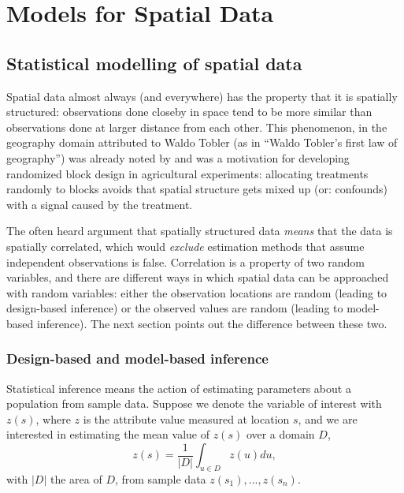 \documentclass[]{book}
\begin{document}
\hypertarget{part-models-for-spatial-data}{%
\part{Models for Spatial Data}\label{part-models-for-spatial-data}}

\hypertarget{statistical-modelling-of-spatial-data}{%
\chapter{Statistical modelling of spatial data}\label{statistical-modelling-of-spatial-data}}

Spatial data almost always (and everywhere) has the property that it
is spatially structured: observations done closeby in space tend to
be more similar than observations done at larger distance from each
other. This phenomenon, in the geography domain attributed to Waldo
Tobler (as in ``Waldo Tobler's first law of geography'') was already
noted by \citep{fisher1937design} and was a motivation for developing
randomized block design in agricultural experiments: allocating
treatments randomly to blocks avoids that spatial structure gets
mixed up (or: confounds) with a signal caused by the treatment.

The often heard argument that spatially structured data \emph{means}
that the data is spatially correlated, which would \emph{exclude}
estimation methods that assume independent observations is false.
Correlation is a property of two random variables, and there are
different ways in which spatial data can be approached with random
variables: either the observation locations are random (leading to
design-based inference) or the observed values are random (leading
to model-based inference). The next section points out the difference
between these two.

\hypertarget{design}{%
\section{Design-based and model-based inference}\label{design}}

Statistical inference means the action of estimating parameters
about a population from sample data. Suppose we denote the variable
of interest with \(z(s)\), where \(z\) is the attribute value measured
at location \(s\), and we are interested in estimating the
mean value of \(z(s)\) over a domain \(D\),
\[z(s)=\frac{1}{|D|} \int_{ u \in D} z(u)du,\]
with \(|D|\) the area of \(D\), from sample data \(z(s_1),...,z(s_n)\).
\end{document}
